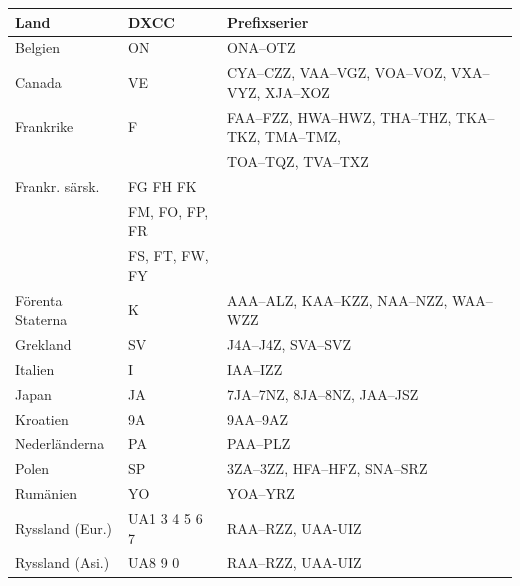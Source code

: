 \begin{center}
  \begin{small}
    \begin{longtable}{lll}
      \textbf{Land}                          & \textbf{DXCC}  & \textbf{Prefixserier}                             \\ \hline
			Belgien              & ON             & ONA--OTZ                                          \\
			Canada               & VE             & CYA--CZZ, VAA--VGZ, VOA--VOZ, VXA--VYZ, XJA--XOZ  \\
			Frankrike            & F              & FAA--FZZ, HWA--HWZ, THA--THZ, TKA--TKZ, TMA--TMZ, \\
			                     &                & TOA--TQZ, TVA--TXZ                                \\
			Frankr. särsk.       & FG FH FK       &                                                   \\
			                     & FM, FO, FP, FR &                                                   \\
			                     & FS, FT, FW, FY &                                                   \\
			Förenta Staterna     & K              & AAA--ALZ, KAA--KZZ, NAA--NZZ, WAA--WZZ            \\
			Grekland             & SV             & J4A--J4Z, SVA--SVZ                                \\
			Italien              & I              & IAA--IZZ                                          \\
			Japan                & JA             & 7JA--7NZ, 8JA--8NZ, JAA--JSZ                      \\
			Kroatien             & 9A             & 9AA--9AZ                                          \\
			Nederländerna        & PA             & PAA--PLZ                                          \\
			Polen                & SP             & 3ZA--3ZZ, HFA--HFZ, SNA--SRZ                      \\
			Rumänien             & YO             & YOA--YRZ                                          \\
			Ryssland (Eur.)      & UA1 3 4 5 6 7  & RAA--RZZ, UAA-UIZ                                 \\
			Ryssland (Asi.)      & UA8 9 0        & RAA--RZZ, UAA-UIZ                                 \\

\end{longtable}
\end{small}
\end{center}
